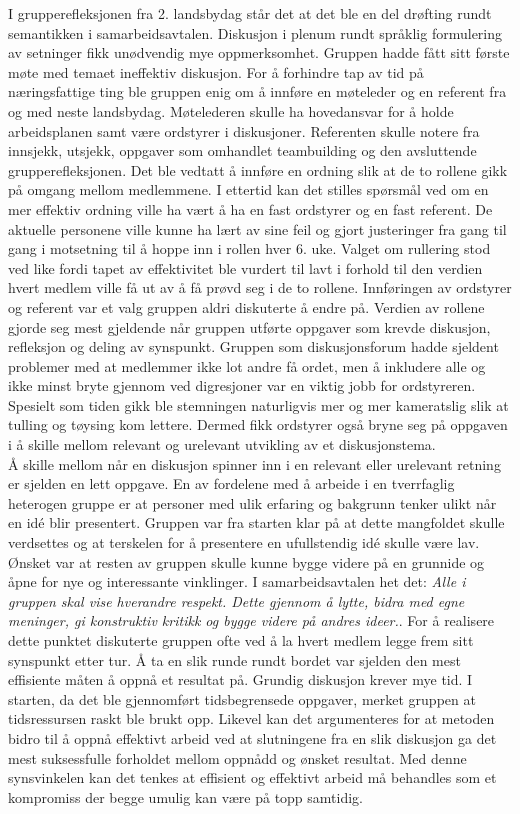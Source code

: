 I grupperefleksjonen fra 2. landsbydag står det at det ble en del drøfting rundt semantikken i samarbeidsavtalen. 
Diskusjon i plenum rundt språklig formulering av setninger fikk unødvendig mye oppmerksomhet.
Gruppen hadde fått sitt første møte med temaet ineffektiv diskusjon.
For å forhindre tap av tid på næringsfattige ting ble gruppen enig om å innføre en møteleder og en referent fra og med neste landsbydag.
Møtelederen skulle ha hovedansvar for å holde arbeidsplanen samt være ordstyrer i diskusjoner.
Referenten skulle notere fra innsjekk, utsjekk, oppgaver som omhandlet teambuilding og den avsluttende grupperefleksjonen.
Det ble vedtatt å innføre en ordning slik at de to rollene gikk på omgang mellom medlemmene.
I ettertid kan det stilles spørsmål ved om en mer effektiv ordning ville ha vært å ha en fast ordstyrer og en fast referent.
De aktuelle personene ville kunne ha lært av sine feil og gjort justeringer fra gang til gang i motsetning til å hoppe inn i rollen hver 6. uke.
Valget om rullering stod ved like fordi tapet av effektivitet ble vurdert til lavt i forhold til den verdien hvert medlem ville få ut av å få prøvd seg i de to rollene.
Innføringen av ordstyrer og referent var et valg gruppen aldri diskuterte å endre på. 
Verdien av rollene gjorde seg mest gjeldende når gruppen utførte oppgaver som krevde diskusjon, refleksjon og deling av synspunkt.
Gruppen som diskusjonsforum hadde sjeldent problemer med at medlemmer ikke lot andre få ordet, men å inkludere alle og ikke minst bryte gjennom ved digresjoner var en viktig jobb for ordstyreren. 
Spesielt som tiden gikk ble stemningen naturligvis mer og mer kameratslig slik at tulling og tøysing kom lettere.
Dermed fikk ordstyrer også bryne seg på oppgaven i å skille mellom relevant og urelevant utvikling av et diskusjonstema.\\

Å skille mellom når en diskusjon spinner inn i en relevant eller urelevant retning er sjelden en lett oppgave.
En av fordelene med å arbeide i en tverrfaglig heterogen gruppe er at personer med ulik erfaring og bakgrunn tenker ulikt når en id\'{e} blir presentert.
Gruppen var fra starten klar på at dette mangfoldet skulle verdsettes og at terskelen for å presentere en ufullstendig id\'{e} skulle være lav.
Ønsket var at resten av gruppen skulle kunne bygge videre på en grunnide og åpne for nye og interessante vinklinger. 
I samarbeidsavtalen het det: \textit{Alle i gruppen skal vise hverandre respekt. Dette gjennom å lytte, bidra med egne meninger, gi konstruktiv kritikk og bygge videre på andres ideer.}.
For å realisere dette punktet diskuterte gruppen ofte ved å la hvert medlem legge frem sitt synspunkt etter tur.
Å ta en slik runde rundt bordet var sjelden den mest effisiente måten å oppnå et resultat på.
Grundig diskusjon krever mye tid. 
I starten, da det ble gjennomført tidsbegrensede oppgaver, merket gruppen at tidsressursen raskt ble brukt opp.
Likevel kan det argumenteres for at metoden bidro til å oppnå effektivt arbeid ved at slutningene fra en slik diskusjon ga det mest suksessfulle forholdet mellom oppnådd og ønsket resultat.
Med denne synsvinkelen kan det tenkes at effisient og effektivt arbeid må behandles som et kompromiss der begge umulig kan være på topp samtidig.\\

